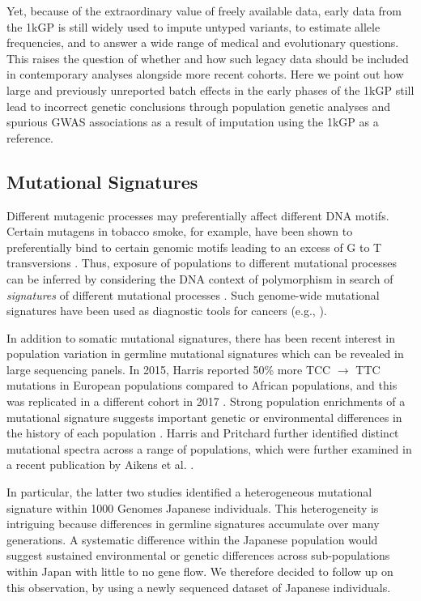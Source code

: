 \documentclass[9pt,lineno]{template}
\begin{document}
Yet, because of the extraordinary value of freely available data, early data from the 1kGP is still widely used to impute untyped variants, to estimate allele frequencies, and to answer a wide range of medical and evolutionary questions.
This raises the question of whether and how such legacy data should be included in contemporary analyses alongside more recent cohorts.
Here we point out how large and previously unreported batch effects in the early phases of the 1kGP still lead to incorrect genetic conclusions through population genetic analyses and spurious GWAS associations as a result of imputation using the 1kGP as a reference.

\subsection{Mutational Signatures}

Different mutagenic processes may preferentially affect different DNA motifs. 
Certain mutagens in tobacco smoke, for example, have been shown to preferentially bind to certain genomic motifs leading to an excess of G to T transversions \citep{Pfeifer2002,Pleasance2010}. 
Thus, exposure of populations to different mutational processes can be inferred by considering the DNA context of polymorphism in search of \textit{signatures} of different mutational processes \citep{Alexandrov2013,Shiraishi2015a}. 
Such genome-wide mutational signatures have been used as diagnostic tools for cancers (e.g., \cite{Alexandrov2013,Shiraishi2015a}).

In addition to somatic mutational signatures, there has been recent interest in population variation in germline mutational signatures which can be revealed in large sequencing panels. 
In 2015, Harris reported 50\% more TCC ${\rightarrow}$ TTC mutations in European populations compared to African populations, and this was replicated in a different cohort in 2017 \citep{Harris2015a, Harris2017a, Mathieson2017a}. 
Strong population enrichments of a mutational signature suggests important genetic or environmental differences in the history of each population \citep{Harris2015a, Harris2017a}. 
Harris and Pritchard further identified distinct mutational spectra across a range of populations, which were further examined in a recent publication by Aikens et al. \citep{Harris2017a,Aikens2018}.
 
In particular, the latter two studies  identified a heterogeneous mutational signature within 1000 Genomes Japanese individuals.
This heterogeneity is intriguing because differences in germline signatures accumulate over many generations.
A systematic difference within the Japanese population would suggest sustained environmental or genetic differences across sub-populations within Japan with little to no gene flow.
We therefore decided to follow up on this observation, by using a newly sequenced dataset of Japanese individuals. 
\end{document}
